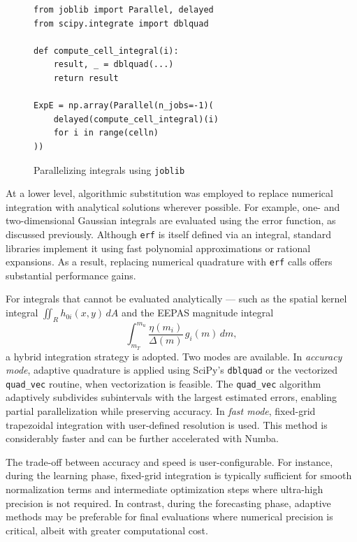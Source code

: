 \documentclass[extra,mreferee]{gji}
\theoremstyle{lemma}
\begin{document}
\begin{figure}
\begin{lstlisting}[style=mypython]
from joblib import Parallel, delayed
from scipy.integrate import dblquad

def compute_cell_integral(i):
    result, _ = dblquad(...)
    return result

ExpE = np.array(Parallel(n_jobs=-1)(
    delayed(compute_cell_integral)(i)
    for i in range(celln)
))
\end{lstlisting}
\caption{Parallelizing integrals using \texttt{joblib}}
\label{lst:joblib}
\end{figure}

At a lower level, algorithmic substitution was employed to replace numerical integration with analytical solutions wherever possible. For example, one- and two-dimensional Gaussian integrals are evaluated using the error function, as discussed previously. Although \texttt{erf} is itself defined via an integral, standard libraries implement it using fast polynomial approximations or rational expansions. As a result, replacing numerical quadrature with \texttt{erf} calls offers substantial performance gains.

For integrals that cannot be evaluated analytically — such as the spatial kernel integral $\iint_R h_{0i}(x,y)\,dA$ and the EEPAS magnitude integral
\[
\int_{m_T}^{m_u} \frac{\eta(m_i)}{\Delta(m)}\, g_i(m)\,dm,
\]
a hybrid integration strategy is adopted. Two modes are available. In \emph{accuracy mode}, adaptive quadrature is applied using SciPy’s \texttt{dblquad} or the vectorized \texttt{quad\_vec} routine, when vectorization is feasible. The \texttt{quad\_vec} algorithm adaptively subdivides subintervals with the largest estimated errors, enabling partial parallelization while preserving accuracy. In \emph{fast mode}, fixed-grid trapezoidal integration with user-defined resolution is used. This method is considerably faster and can be further accelerated with Numba.

The trade-off between accuracy and speed is user-configurable. For instance, during the learning phase, fixed-grid integration is typically sufficient for smooth normalization terms and intermediate optimization steps where ultra-high precision is not required. In contrast, during the forecasting phase, adaptive methods may be preferable for final evaluations where numerical precision is critical, albeit with greater computational cost.
\end{document}
